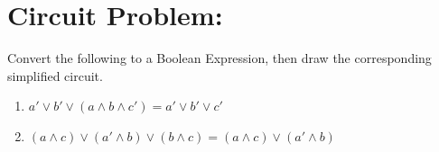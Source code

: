 \documentclass[12pt]{article}
\begin{document}
\section{Circuit Problem:}
Convert the following to a Boolean Expression, then draw the corresponding simplified circuit.
\newpage\begin{enumerate}[label=(\alph*)]
    \item $a'\vee b'\vee(a\wedge b\wedge c')=a'\vee b'\vee c'$
    \newline{}
    \item $(a\wedge c)\vee(a'\wedge b)\vee(b\wedge c)=(a\wedge c)\vee(a'\wedge b)$
    \newline{}

\end{enumerate}
\end{document}
